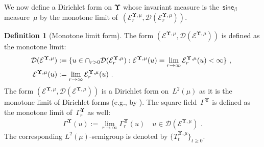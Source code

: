 \documentclass[11pt,letterpaper]{amsart}
\newcommand{\T}{\tau} %
\newcommand{\A}{\Sigma} %
\newcommand{\Bo}[1]{\msB_{#1}} %
\newcommand{\dom}[1]{\mathcal D(#1)}
\newcommand{\sem}[1]{\{#1\}_{t \ge 0}}
\newcommand{\paren}[1]{\left(#1\right)}							%
\newcommand{\seq}[1]{\paren{#1}}								%
\newcommand{\N}{{\mathbb N}}
\newcommand{\comma}{\,\,\mathrm{,}\;\,}
\newcommand{\fstop}{\,\,\mathrm{.}}
\newcommand{\cdc}{\Gamma}
\newcommand{\purple}[1]{{\color{purple}#1}}
\newcommand{\QP}{{\mu}}
\newcommand{\dUpsilon}{{\mathbf \Upsilon}}
\newcommand{\U}{\dUpsilon}
\newcommand{\sine}{\mathsf{sine}}
\newcommand{\E}{\mathcal E}
\renewcommand{\1}{\mathbf 1}
\renewcommand{\msE}{\mathscr K}
\numberwithin{equation}{section}
\theoremstyle{plain}
\theoremstyle{definition}
\newtheorem{defs}[thm]{Definition}%
\theoremstyle{remark}
\begin{document}
We now define a Dirichlet form on $\U$ whose invariant measure is the~$\sine_\beta$ measure~$\QP$ by the monotone limit of~$(\E^{\U, \QP}_r, \dom{\E^{\U, \QP}_r})$. 
\begin{defs}[Monotone limit form] \label{d:DFF}
The form $(\E^{\U, \QP}, \dom{\E^{\U, \QP}})$ is defined as the monotone limit:
\begin{align} \label{eq:Temptation} 
\dom{\E^{\U, \QP}}&:=\{u \in \cap_{r>0} \dom{\E^{\U, \QP}_r}: \E^{\U, \QP}(u) = \lim_{r \to \infty}\E^{\U, \QP}_r(u) <\infty\} \comma
\\
\E^{\U, \QP}(u)&:=\lim_{r \to \infty}\E^{\U, \QP}_r(u) \fstop \notag
\end{align} 
The form $(\E^{\U, \QP}, \dom{\E^{\U, \QP}})$ is a Dirichlet form on~$L^2(\mu)$ as it is the monotone limit of Dirichlet forms (e.g., by \cite[Exercise 3.9]{MaRoe90}).
The square field~$\cdc^\U$ is defined as the monotone limit of~$\cdc^\U_r$ as well:
\begin{align} \label{d:SF}
\cdc^\U(u):=\lim_{r \to \infty}\cdc^\U_r(u) \quad u \in \dom{\E^{\U, \QP}}\fstop
\end{align}
The corresponding $L^2(\mu)$-semigroup is denoted by $\sem{T^{\U, \QP}_t}$.

%
%

\end{defs}
\end{document}
